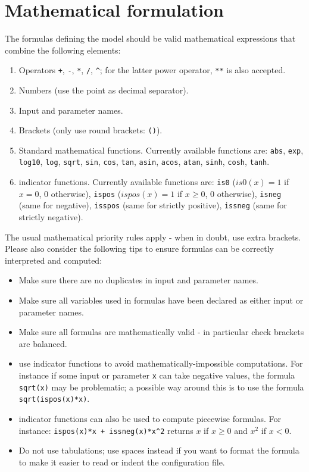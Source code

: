 \documentclass[a4paper]{article}
\begin{document}
\section{Mathematical formulation}

The formulas defining the model should be valid mathematical expressions that combine the following elements:

\begin{enumerate}
\item Operators \texttt{+}, \texttt{-}, \texttt{*}, \texttt{/}, \texttt{\^{}}; for the latter power operator, \texttt{**} is also accepted.
\item Numbers (use the point as decimal separator).
\item Input and parameter names.
\item Brackets (only use round brackets: \texttt{()}).
\item Standard mathematical functions. Currently available functions are:  \texttt{abs}, \texttt{exp}, \texttt{log10}, \texttt{log}, \texttt{sqrt}, \texttt{sin}, \texttt{cos}, \texttt{tan}, \texttt{asin}, \texttt{acos}, \texttt{atan}, \texttt{sinh}, \texttt{cosh}, \texttt{tanh}.
\item indicator functions. Currently available functions are: \texttt{is0} ($is0(x)=1$ if $x=0$, $0$ otherwise), \texttt{ispos} ($ispos(x)=1$ if $x\geq0$, $0$ otherwise), \texttt{isneg} (same for negative),  \texttt{isspos} (same for strictly positive), \texttt{issneg} (same for strictly negative).
\end{enumerate}

The usual mathematical priority rules apply - when in doubt, use extra brackets. Please also consider the following tips to ensure formulas can be correctly interpreted and computed:

\begin{itemize}
\item Make sure there are no duplicates in input and parameter names.
\item Make sure all variables used in formulas have been declared as either input or parameter names.
\item Make sure all formulas are mathematically valid - in particular check brackets are balanced.
\item use indicator functions to avoid mathematically-impossible computations. For instance if some input or parameter \texttt{x} can take negative values, the formula \texttt{sqrt(x)} may be problematic; a possible way around this is to use the formula \texttt{sqrt(ispos(x)*x)}.
\item indicator functions can also be used to compute piecewise formulas. For instance:  \texttt{ispos(x)*x + issneg(x)*x\^{}2} returns $x$ if $x\geq0$ and $x^2$ if $x<0$.
\item Do not use tabulations; use spaces instead if you want to format the formula to make it easier to read or indent the configuration file.
\end{itemize}
\end{document}
